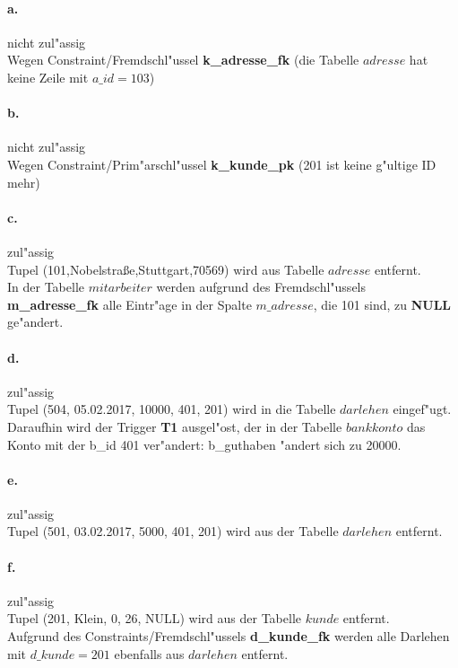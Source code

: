 \documentclass{article}
\begin{document}
		\paragraph*{a.}nicht zul"assig\\
		Wegen Constraint/Fremdschl"ussel \textbf{k\_adresse\_fk} (die Tabelle $ adresse $ hat keine Zeile mit $a\_id = 103$)
		
		\paragraph*{b.}nicht zul"assig\\
		Wegen Constraint/Prim"arschl"ussel \textbf{k\_kunde\_pk} (201 ist keine g"ultige ID mehr)
		
		\paragraph*{c.}zul"assig\\
		Tupel (101,Nobelstraße,Stuttgart,70569) wird aus Tabelle $ adresse $ entfernt.\\
		In der Tabelle $ mitarbeiter $ werden aufgrund des Fremdschl"ussels \textbf{m\_adresse\_fk} alle Eintr"age in der Spalte $ m\_adresse $, die 101 sind, zu \textbf{NULL} ge"andert.
		
		\paragraph*{d.}zul"assig\\
		Tupel (504, 05.02.2017, 10000, 401, 201) wird in die Tabelle $ darlehen $ eingef"ugt.\\ Daraufhin wird der Trigger \textbf{T1} ausgel"ost, der in der Tabelle $ bankkonto $ das Konto mit der b\_id 401 ver"andert: b\_guthaben "andert sich zu 20000.
		
		\paragraph*{e.}zul"assig\\
		Tupel (501, 03.02.2017, 5000, 401, 201) wird aus der Tabelle $ darlehen $ entfernt.
		
		\paragraph*{f.}zul"assig\\
		Tupel (201, Klein, 0, 26, NULL) wird aus der Tabelle $ kunde $ entfernt.\\
		Aufgrund des Constraints/Fremdschl"ussels \textbf{d\_kunde\_fk} werden alle Darlehen mit $ d\_kunde = 201 $ ebenfalls aus $ darlehen $ entfernt.
		
\end{document}
